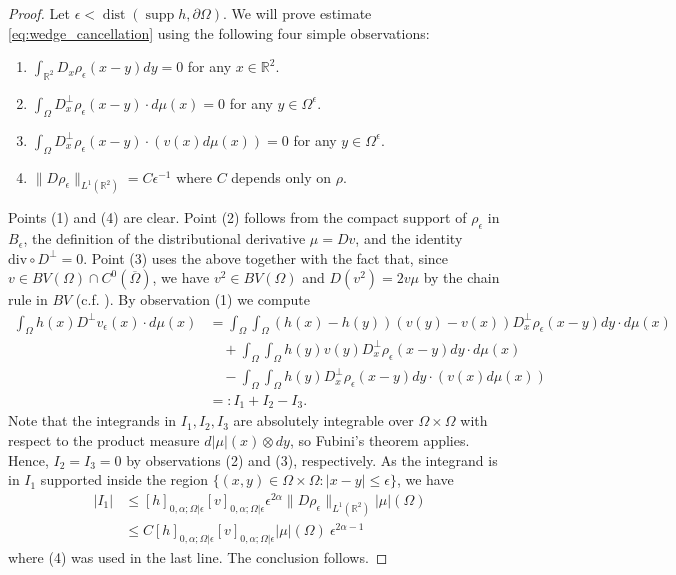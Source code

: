 \documentclass[12pt]{article}
\newcommand{\R}{\mathbb{R}}
\newcommand{\dist}{\operatorname{dist}}
\theoremstyle{plain}
\numberwithin{equation}{section}
\begin{document}
\begin{proof}
    Let $\epsilon < \dist(\operatorname{supp} h,\partial\Omega)$. We will prove estimate \eqref{eq:wedge_cancellation} using the following four simple observations:
    \begin{enumerate}[(1)]
        \item $\int_{\R^2} D_x\rho_\epsilon(x-y)dy = 0$ for any $x \in \R^2$. 
        \item $\int_{\Omega} D_x^\perp \rho_\epsilon (x-y) \cdot d\mu(x) = 0$ for any $y \in \Omega^\epsilon$.
        \item $\int_\Omega D_x^\perp \rho_\epsilon(x-y) \cdot (v(x)d\mu(x)) = 0$ for any $y \in \Omega^\epsilon$.
        \item $\|D\rho_\epsilon\|_{L^1(\R^2)} = C \epsilon^{-1}$ where $C$ depends only on $\rho$.
    \end{enumerate}
    Points (1) and (4) are clear. Point (2) follows from the compact support of $\rho_\epsilon$ in $B_\epsilon$, the definition of the distributional derivative $\mu = Dv$, and the identity $\mathrm{div} \circ D^\perp = 0$. Point (3) uses the above together with the fact that, since $v \in BV(\Omega) \cap  C^0(\overline\Omega)$, we have $v^2 \in BV(\Omega)$ and $D(v^2) = 2v\mu$ by the chain rule in $BV$ (c.f. \cite[Theorem 3.96]{ambrosio_00}). By observation (1) we compute
    \begin{align*}
        \int_\Omega h(x)D^\perp v_\epsilon(x) \cdot d\mu(x) &= \int_\Omega \int_\Omega (h(x)-h(y))(v(y)-v(x)) D_x^\perp \rho_\epsilon(x-y) dy \cdot d\mu(x)\\
        &\quad + \int_\Omega \int_\Omega h(y)v(y) D_x^\perp \rho_\epsilon(x-y)dy \cdot d\mu(x)\\
        &\quad - \int_\Omega \int_\Omega h(y) D_x^\perp \rho_\epsilon(x-y)dy \cdot (v(x)d\mu(x))\\
        &=: I_1 + I_2 - I_3.
    \end{align*}
    Note that the integrands in $I_1, I_2, I_3$ are absolutely integrable over $\Omega \times \Omega$ with respect to the product measure $d|\mu|(x) \otimes dy$, so Fubini's theorem applies. Hence, $I_2 = I_3 = 0$ by observations (2) and (3), respectively. As the integrand is in $I_1$ supported inside the region $\{(x,y) \in \Omega \times \Omega : |x-y| \leq \epsilon\}$, we have
    \begin{align*}
        |I_1| &\leq [h]_{0,\alpha;\Omega|\epsilon}[v]_{0,\alpha;\Omega|\epsilon}  \epsilon^{2\alpha} \|D\rho_\epsilon\|_{L^1(\R^2)} |\mu|(\Omega)\\
        &\leq C [h]_{0,\alpha;\Omega|\epsilon} [v]_{0,\alpha;\Omega|\epsilon} |\mu|(\Omega) ~ \epsilon^{2\alpha-1}
    \end{align*}
    where (4) was used in the last line. The conclusion follows.
\end{proof}
\end{document}
